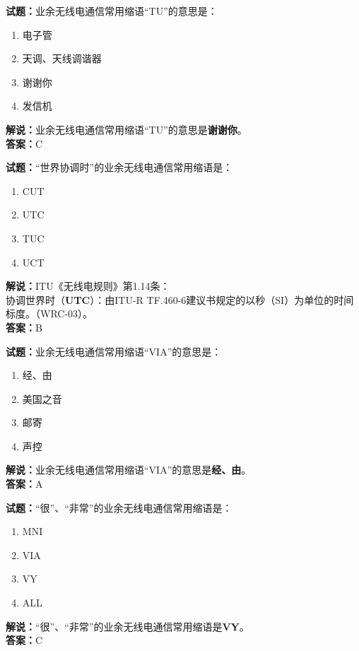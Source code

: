 \documentclass{ctexbook}
\begin{document}
\bigskip


\noindent\textbf{试题：}业余无线电通信常用缩语“TU”的意思是：
\begin{enumerate}[leftmargin=3em]
\item 电子管
\item 天调、天线调谐器
\item 谢谢你
\item 发信机
\end{enumerate}
\noindent\textbf{解说：}业余无线电通信常用缩语“TU”的意思是\textbf{谢谢你}。\\\noindent\textbf{答案：}C



\bigskip


\noindent\textbf{试题：}“世界协调时”的业余无线电通信常用缩语是：
\begin{enumerate}[leftmargin=3em]
\item CUT
\item UTC
\item TUC
\item UCT
\end{enumerate}
\noindent\textbf{解说：}ITU《无线电规则》第1.14条：\\协调世界时（\textbf{UTC}）：由ITU-R TF.460-6建议书规定的以秒（SI）为单位的时间标度。（WRC-03）。\\\noindent\textbf{答案：}B



\bigskip


\noindent\textbf{试题：}业余无线电通信常用缩语“VIA”的意思是：
\begin{enumerate}[leftmargin=3em]
\item 经、由
\item 美国之音%
\item 邮寄
\item 声控
\end{enumerate}
\noindent\textbf{解说：}业余无线电通信常用缩语“VIA”的意思是\textbf{经、由}。\\\noindent\textbf{答案：}A


\bigskip


\noindent\textbf{试题：}“很”、“非常”的业余无线电通信常用缩语是：
\begin{enumerate}[leftmargin=3em]
\item MNI
\item VIA
\item VY
\item ALL
\end{enumerate}
\noindent\textbf{解说：}“很”、“非常”的业余无线电通信常用缩语是\textbf{VY}。\\\noindent\textbf{答案：}C
\end{document}
